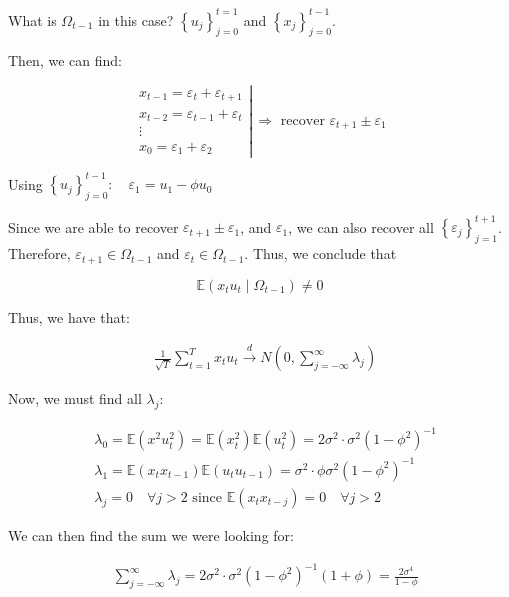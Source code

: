 {{\begin{enumerate}[label=(\alph*)]
{What is $\Omega_{t-1}$ in this case? $\left\{u_{j}\right\}_{j=0}^{t=1}$ and $\left\{x_{j}\right\}_{j=0}^{t-1}$.

Then, we can find:

$$
\left.\begin{gathered}
x_{t-1}=\varepsilon_{t}+\varepsilon_{t+1} \\
x_{t-2}=\varepsilon_{t-1}+\varepsilon_{t} \\
\vdots \\
x_{0}=\varepsilon_{1}+\varepsilon_{2}
\end{gathered} \right\rvert\, \Rightarrow \text { recover } \varepsilon_{t+1} \pm \varepsilon_{1}
$$

Using $\left\{u_{j}\right\}_{j=0}^{t-1}: \quad \varepsilon_{1}=u_{1}-\phi u_{0}$

Since we are able to recover $\varepsilon_{t+1} \pm \varepsilon_{1}$, and $\varepsilon_{1}$, we can also recover all $\left\{\varepsilon_{j}\right\}_{j=1}^{t+1}$. Therefore, $\varepsilon_{t+1} \in \Omega_{t-1}$ and $\varepsilon_t \in \Omega_{t-1}$. Thus, we conclude that

$$
\mathbb{E}\left(x_{t} u_{t} \mid \Omega_{t-1}\right) \neq 0
$$

Thus, we have that:

$$
\begin{aligned}
& \frac{1}{\sqrt{T}} \sum_{t=1}^{T} x_{t} u_{t} \xrightarrow{d} N\left(0, \sum_{j=-\infty}^{\infty} \lambda_{j}\right)
\end{aligned}
$$

Now, we must find all $\lambda_j$:

$$
\begin{aligned}
& \lambda_{0}= \mathbb{E}\left(x^{2} u_{t}^{2}\right)=\mathbb{E}\left(x_{t}^{2}\right) \mathbb{E}\left(u_{t}^{2}\right)=2 \sigma^{2} \cdot \sigma^{2}\left(1-\phi^{2}\right)^{-1} \\
& \lambda_{1}=\mathbb{E}\left(x_{t} x_{t-1}\right) \mathbb{E}\left(u_{t} u_{t-1}\right)=\sigma^{2} \cdot \phi \sigma^{2}\left(1-\phi^{2}\right)^{-1} \\
& \lambda_{j}= 0 \quad \forall j>2 \text { since } \mathbb{E}\left(x_{t} x_{t-j}\right)=0 \quad \forall j>2 \end{aligned}
$$

We can then find the sum we were looking for:

$$
\begin{aligned}
& \sum_{j=-\infty}^{\infty} \lambda_{j}=2 \sigma^{2} \cdot \sigma^{2}\left(1-\phi^{2}\right)^{-1}(1+\phi)=\frac{2 \sigma^{4}}{1-\phi}
\end{aligned}
$$

}
\end{enumerate}}}
